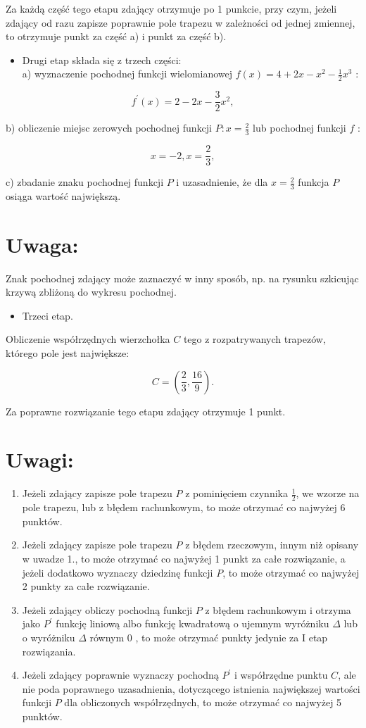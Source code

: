 \documentclass[10pt]{article}
\begin{document}
Za każdą część tego etapu zdający otrzymuje po 1 punkcie, przy czym, jeżeli zdający od razu zapisze poprawnie pole trapezu w zależności od jednej zmiennej, to otrzymuje punkt za część a) i punkt za część b).

\begin{itemize}
  \item Drugi etap składa się z trzech części:\\
a) wyznaczenie pochodnej funkcji wielomianowej $f(x)=4+2 x-x^{2}-\frac{1}{2} x^{3}$ :
\end{itemize}

$$
f^{\prime}(x)=2-2 x-\frac{3}{2} x^{2},
$$

b) obliczenie miejsc zerowych pochodnej funkcji $P: x=\frac{2}{3}$ lub pochodnej funkcji $f$ :

$$
x=-2, x=\frac{2}{3},
$$

c) zbadanie znaku pochodnej funkcji $P$ i uzasadnienie, że dla $x=\frac{2}{3}$ funkcja $P$ osiąga wartość największą.

\section*{Uwaga:}
Znak pochodnej zdający może zaznaczyć w inny sposób, np. na rysunku szkicując krzywą zbliżoną do wykresu pochodnej.

\begin{itemize}
  \item Trzeci etap.
\end{itemize}

Obliczenie współrzędnych wierzchołka $C$ tego z rozpatrywanych trapezów, którego pole jest największe:

$$
C=\left(\frac{2}{3}, \frac{16}{9}\right) .
$$

Za poprawne rozwiązanie tego etapu zdający otrzymuje 1 punkt.

\section*{Uwagi:}
\begin{enumerate}
  \item Jeżeli zdający zapisze pole trapezu $P$ z pominięciem czynnika $\frac{1}{2}$, we wzorze na pole trapezu, lub z błędem rachunkowym, to może otrzymać co najwyżej 6 punktów.
  \item Jeżeli zdający zapisze pole trapezu $P$ z błędem rzeczowym, innym niż opisany w uwadze 1., to może otrzymać co najwyżej 1 punkt za całe rozwiązanie, a jeżeli dodatkowo wyznaczy dziedzinę funkcji $P$, to może otrzymać co najwyżej 2 punkty za całe rozwiązanie.
  \item Jeżeli zdający obliczy pochodną funkcji $P$ z błędem rachunkowym i otrzyma jako $P^{\prime}$ funkcję liniową albo funkcję kwadratową o ujemnym wyróżniku $\Delta$ lub o wyróżniku $\Delta$ równym 0 , to może otrzymać punkty jedynie za I etap rozwiązania.
  \item Jeżeli zdający poprawnie wyznaczy pochodną $P^{\prime}$ i współrzędne punktu $C$, ale nie poda poprawnego uzasadnienia, dotyczącego istnienia największej wartości funkcji $P$ dla obliczonych współrzędnych, to może otrzymać co najwyżej 5 punktów.
\end{enumerate}
\end{document}
